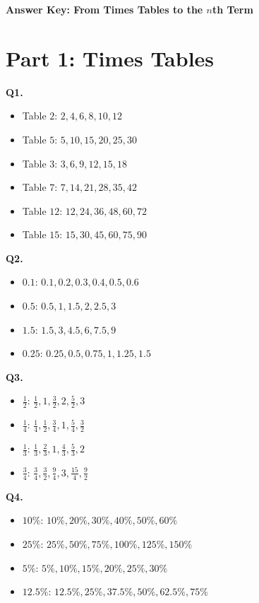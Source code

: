 \documentclass[11pt,a4paper]{article}
\begin{document}
\small

\begin{center}
{\Large\bfseries Answer Key: From Times Tables to the \(n\)th Term}
\end{center}

\section*{Part 1: Times Tables}

\textbf{Q1.}
\begin{itemize}
\item Table \(2\): \(2,4,6,8,10,12\)
\item Table \(5\): \(5,10,15,20,25,30\)
\item Table \(3\): \(3,6,9,12,15,18\)
\item Table \(7\): \(7,14,21,28,35,42\)
\item Table \(12\): \(12,24,36,48,60,72\)
\item Table \(15\): \(15,30,45,60,75,90\)
\end{itemize}

\textbf{Q2.}
\begin{itemize}
\item \(0.1\): \(0.1,0.2,0.3,0.4,0.5,0.6\)
\item \(0.5\): \(0.5,1,1.5,2,2.5,3\)
\item \(1.5\): \(1.5,3,4.5,6,7.5,9\)
\item \(0.25\): \(0.25,0.5,0.75,1,1.25,1.5\)
\end{itemize}

\textbf{Q3.}
\begin{itemize}
\item \(\frac12\): \(\frac12,1,\frac32,2,\frac52,3\)
\item \(\frac14\): \(\frac14,\frac12,\frac34,1,\frac54,\frac32\)
\item \(\frac13\): \(\frac13,\frac23,1,\frac43,\frac53,2\)
\item \(\frac34\): \(\frac34,\frac32,\frac94,3,\frac{15}{4},\frac92\)
\end{itemize}

\textbf{Q4.}
\begin{itemize}
\item \(10\%\): \(10\%,20\%,30\%,40\%,50\%,60\%\)
\item \(25\%\): \(25\%,50\%,75\%,100\%,125\%,150\%\)
\item \(5\%\): \(5\%,10\%,15\%,20\%,25\%,30\%\)
\item \(12.5\%\): \(12.5\%,25\%,37.5\%,50\%,62.5\%,75\%\)
\end{itemize}
\end{document}
